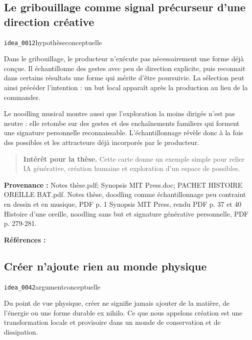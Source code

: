 \documentclass[10pt,a4paper]{article}
\begin{document}
\subsection{Le gribouillage comme signal précurseur d'une direction créative}
{\small\color{metadata} \texttt{idea\_0012}\quad\textbullet\quad hypothèse\quad\textbullet\quad conceptuelle\par}

Dans le gribouillage, le producteur n'exécute pas nécessairement une forme déjà conçue. Il échantillonne des gestes avec peu de direction explicite, puis reconnait dans certains résultats une forme qui mérite d'être poursuivie. La sélection peut ainsi précéder l'intention : un but local apparaît après la production au lieu de la commander.

Le noodling musical montre aussi que l'exploration la moins dirigée n'est pas neutre : elle retombe sur des gestes et des enchaînements familiers qui forment une signature personnelle reconnaissable. L'échantillonnage révèle donc à la fois des possibles et les attracteurs déjà incorporés par le producteur.

\begin{quote}
\textbf{Intérêt pour la thèse.} Cette carte donne un exemple simple pour relier IA générative, création humaine et exploration d'un espace de possibles.
\end{quote}
{\footnotesize\color{metadata}\textbf{Provenance :} Notes thèse.pdf; Synopsis MIT Press.doc; PACHET HISTOIRE OREILLE BAT.pdf. Notes thèse, doodling comme échantillonnage peu contraint en dessin et en musique, PDF p. 1 Synopsis MIT Press, rendu PDF p. 37 et 40 Histoire d'une oreille, noodling sans but et signature générative personnelle, PDF p. 279-281.\par}
{\footnotesize\color{metadata}\textbf{Références :} \parencite{pachet2018oreille}\par}

\subsection{Créer n'ajoute rien au monde physique}
{\small\color{metadata} \texttt{idea\_0042}\quad\textbullet\quad argument\quad\textbullet\quad conceptuelle\par}

Du point de vue physique, créer ne signifie jamais ajouter de la matière, de l'énergie ou une forme durable ex nihilo. Ce que nous appelons création est une transformation locale et provisoire dans un monde de conservation et de dissipation.
\end{document}

